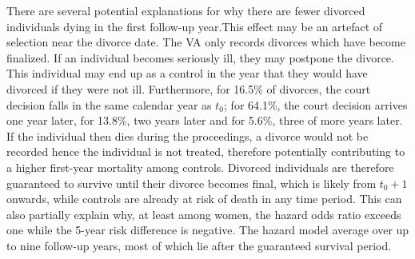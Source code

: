\documentclass[a4paper,12pt]{article}
\theoremstyle{plain}
\theoremstyle{definition}
\theoremstyle{TheoremNum}
\theoremstyle{CorollaryNum}
\theoremstyle{PropositionNum}
\theoremstyle{TheoremNum}
\begin{document}
There are several potential explanations for why there are fewer divorced individuals dying in the first follow-up year.This effect may be an artefact of selection near the divorce date. The VA only records divorces which have become finalized. If an individual becomes seriously ill, they may postpone the divorce. This individual may end up as a control in the year that they would have divorced if they were not ill. Furthermore, for 16.5\% of divorces, the court decision falls in the same calendar year as $t_0$; for 64.1\%, the court decision arrives one year later, for 13.8\%, two years later and for 5.6\%, three of more years later. If the individual then dies during the proceedings, a divorce would not be recorded hence the individual is not treated, therefore potentially contributing to a higher first-year mortality among controls. Divorced individuals are therefore guaranteed to survive until their divorce becomes final, which is likely from $t_0 + 1$ onwards, while controls are already at risk of death in any time period. This can also partially explain why, at least among women, the hazard odds ratio exceeds one while the 5-year risk difference is negative. The hazard model average over up to nine follow-up years, most of which lie after the guaranteed survival period. 
\end{document}
